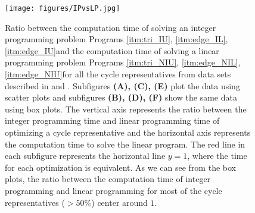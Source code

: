 \begin{figure}[h!]
\begin{center}
\texttt{[image: figures/IPvsLP.jpg]} 
\end{center}
 \caption{ 
 Ratio between the computation time of solving an integer programming problem \DIFaddbeginFL \DIFaddFL{(}\DIFaddendFL Programs \ref{itm:tri_IU}, \ref{itm:edge_IL}, \ref{itm:edge_IU}\DIFaddbeginFL \DIFaddFL{) }\DIFaddendFL and the computation time of solving a linear programming problem \DIFaddbeginFL \DIFaddFL{(}\DIFaddendFL Programs \ref{itm:tri_NIU}, \ref{itm:edge_NIL}, \ref{itm:edge_NIU}\DIFaddbeginFL \DIFaddFL{) }\DIFaddendFL for all the cycle representatives from data sets described in \DIFdelbeginFL \DIFdelFL{\se \ref{tab:realworldata} }\DIFdelendFL \DIFaddbeginFL {}\DIFaddendFL and \DIFdelbeginFL \DIFdelFL{\se \ref{tab:distributiondata}}\DIFdelendFL \DIFaddbeginFL \DIFaddFL{\ref{sec:erdos}}\DIFaddendFL . Subfigures  \textbf{(A), (C), (E)} plot the data using scatter plots and subfigures  \textbf{(B), (D), (F)} show the same data using box plots. The vertical axis represents the ratio between the integer programming time and linear programming time of optimizing a cycle representative and the horizontal axis represents the computation time to solve the linear program. The red line in each subfigure represents the horizontal line $y=1$, where the time for each optimization is equivalent. As we can see from the box plots, the ratio between the computation time of integer programming and linear programming for most of the cycle representatives ($>50\%$) center around $1$.}\label{fig:lp_mip_ratio_df}
\end{figure}

\DIFaddbegin 

